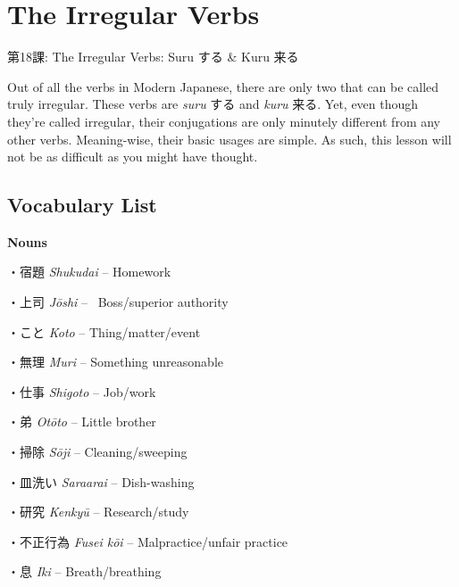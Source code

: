     
\chapter{The Irregular Verbs}

\begin{center}
\begin{Large}
第18課: The Irregular Verbs: Suru する \& Kuru 来る 
\end{Large}
\end{center}
 
\par{ Out of all the verbs in Modern Japanese, there are only two that can be called truly irregular. These verbs are \emph{suru }する and \emph{kuru }来る. Yet, even though they're called irregular, their conjugations are only minutely different from any other verbs. Meaning-wise, their basic usages are simple. As such, this lesson will not be as difficult as you might have thought. }
      
\section{Vocabulary List}
 \textbf{Nouns }
\par{・宿題 \emph{Shukudai }– Homework }
 
\par{・上司 \emph{Jōshi }–  Boss\slash superior authority }
 
\par{・こと \emph{Koto }– Thing\slash matter\slash event }
 
\par{・無理 \emph{Muri }– Something unreasonable }
 
\par{・仕事 \emph{Shigoto }– Job\slash work }
 
\par{・弟 \emph{Otōto }– Little brother }
 
\par{・掃除 \emph{Sōji }– Cleaning\slash sweeping }
 
\par{・皿洗い \emph{Sara\textquotesingle arai }– Dish-washing }
 
\par{・研究 \emph{Kenkyū }– Research\slash study }
 
\par{・不正行為 \emph{Fusei kōi }– Malpractice\slash unfair practice }
 
\par{・息 \emph{Iki }– Breath\slash breathing }
 
